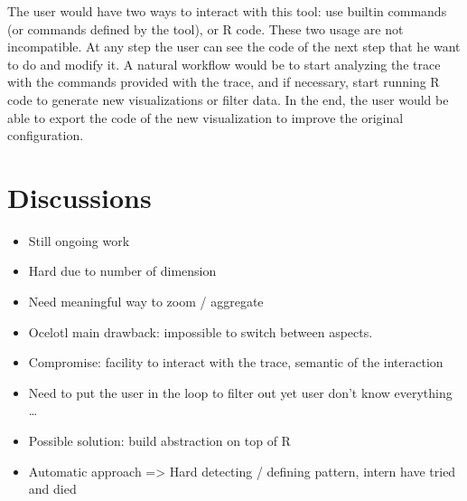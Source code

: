 The user would have two ways to interact with this tool: use builtin commands (or commands defined by the tool), or \gls{R} code.
These two usage are not incompatible.
At any step the user can see the code of the next step that he want to do and modify it.
A natural workflow would be to start analyzing the trace with the commands provided with the trace, and if necessary, start running \gls{R} code to generate new visualizations or filter data.
In the end, the user would be able to export the code of the new visualization to improve the original configuration.

\section{Discussions}
\label{sec:visu-cncl}

\begin{itemize}
    \item Still ongoing work
    \item Hard due to number of dimension
    \item Need meaningful way to zoom / aggregate
    \item Ocelotl main drawback: impossible to switch between aspects.
    \item Compromise: facility to interact with the trace, semantic of the interaction
    \item Need to put the user in the loop to filter out yet user don't know everything \ldots
    \item Possible solution: build abstraction on top of R
    \item Automatic approach => Hard detecting / defining pattern, intern have tried and died
\end{itemize}

